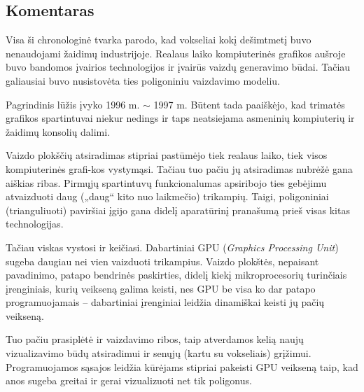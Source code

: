 \subsection{Komentaras}

Visa ši chronologinė tvarka parodo, kad vokseliai kokį dešimtmetį buvo
nenaudojami žaidimų industrijoje. Realaus laiko kompiuterinės grafikos aušroje
buvo bandomos įvairios technologijos ir įvairūs vaizdų generavimo būdai.
Tačiau galiausiai buvo nusistovėta ties poligoniniu vaizdavimo modeliu.

Pagrindinis lūžis įvyko 1996 m. $\sim$ 1997 m. Būtent tada paaiškėjo, kad
trimatės grafikos spartintuvai niekur nedings ir taps neatsiejama asmeninių
kompiuterių ir žaidimų konsolių dalimi.

Vaizdo plokščių atsiradimas stipriai pastūmėjo tiek realaus laiko, tiek visos
kompiuterinės grafi-kos vystymąsi. Tačiau tuo pačiu jų atsiradimas nubrėžė gana
aiškias ribas. Pirmųjų spartintuvų funkcionalumas apsiribojo ties gebėjimu
atvaizduoti daug („daug“ kito nuo laikmečio) trikampių. Taigi, poligoniniai
(trianguliuoti) paviršiai įgijo gana didelį aparatūrinį pranašumą prieš visas
kitas technologijas.

Tačiau viskas vystosi ir keičiasi. Dabartiniai GPU (\emph{Graphics Processing
Unit}) sugeba daugiau nei vien vaizduoti trikampius. Vaizdo plokštės,
nepaisant pavadinimo, patapo bendrinės paskirties, didelį kiekį
mikroprocesorių turinčiais įrenginiais, kurių veikseną galima keisti, nes GPU
be visa ko dar patapo programuojamais -- dabartiniai įrenginiai leidžia
dinamiškai keisti jų pačių veikseną.

Tuo pačiu prasiplėtė ir vaizdavimo ribos, taip atverdamos kelią naujų
vizualizavimo būdų atsiradimui ir senųjų (kartu su vokseliais) grįžimui.
Programuojamos sąsajos leidžia kūrėjams stipriai pakeisti GPU veikseną taip,
kad anos sugeba greitai ir gerai vizualizuoti net tik poligonus.

